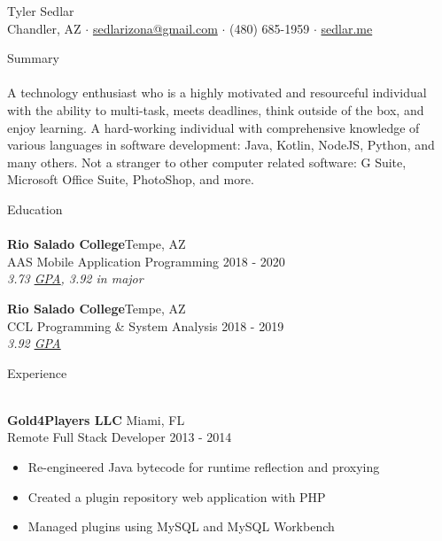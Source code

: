 \documentclass[a4paper]{article}
\newcommand{\lineunder} {
    \vspace*{-8pt} \\
    \hspace*{-18pt} \hrulefill \\
}
\newcommand{\header} [1] {
    {\hspace*{-18pt}\vspace*{6pt} {#1}}
    \vspace*{-6pt} \lineunder
}
\begin{document}
\vspace*{-40pt}
\setul{}{0.25pt}

\vspace*{-10pt}
\begin{center}
	{\Huge {Tyler Sedlar}}\\
	Chandler, AZ $\cdot$ \href{mailto:sedlarizona@gmail.com}{sedlarizona@gmail.com} $\cdot$ (480) 685-1959 $\cdot$ \href{https://sedlar.me/}{sedlar.me}\\
\end{center}

\header{Summary}
A technology enthusiast who is a highly motivated and resourceful individual with the ability to multi-task, meets deadlines, think outside of the box, and enjoy learning.
A hard-working individual with comprehensive knowledge of various languages in software development: Java, Kotlin, NodeJS, Python, and many others.
Not a stranger to other computer related software: G Suite, Microsoft Office Suite, PhotoShop, and more.
\vspace{2mm}

\header{Education}
\textbf{Rio Salado College}\hfill Tempe, AZ\\
AAS Mobile Application Programming \hfill 2018 - 2020\\
\textit{3.73 \href{https://docs.google.com/spreadsheets/d/143DmVdsyjRVbH1ftcySxflvuNjioncAvJpj0vFbzpA8/edit?usp=sharing}{\ul{GPA}}, 3.92 in major}\\

\vspace{2mm}

\textbf{Rio Salado College}\hfill Tempe, AZ\\
CCL Programming \& System Analysis \hfill 2018 - 2019\\
\textit{3.92 \href{https://docs.google.com/spreadsheets/d/143DmVdsyjRVbH1ftcySxflvuNjioncAvJpj0vFbzpA8/edit?usp=sharing}{\ul{GPA}}}\\
\vspace{2mm}

\header{Experience}
\vspace{1mm}

\textbf{Gold4Players LLC} \hfill Miami, FL\\
Remote Full Stack Developer \hfill 2013 - 2014\\
\vspace{-3mm}
\begin{itemize} \itemsep 1pt
	\item Re-engineered Java bytecode for runtime reflection and proxying
	\vspace{-1mm}
	\item Created a plugin repository web application with PHP
	\vspace{-1mm}
	\item Managed plugins using MySQL and MySQL Workbench
\end{itemize}
\end{document}

